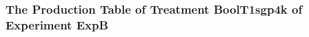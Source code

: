  \begin{frame}
 \fontsize{8pt}{9pt}\selectfont
 \frametitle{ The Production Table of Treatment BoolT1sgp4k of Experiment ExpB }

 \label{ExpBGrammarTable007.tex}  
 \end{frame}

